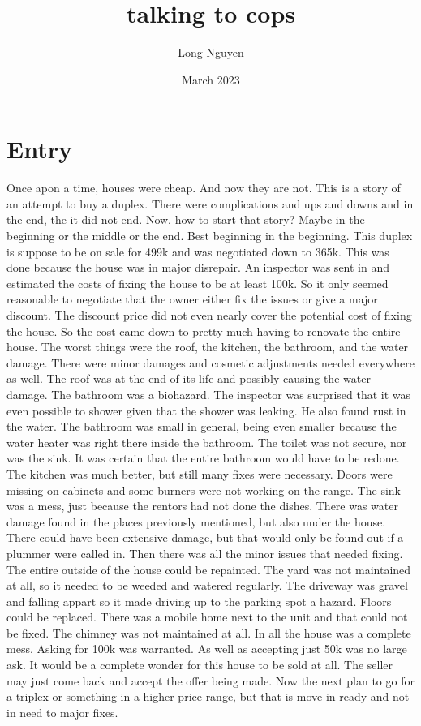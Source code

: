 \documentclass{article}
\title{talking to cops}
\author{Long Nguyen}
\date{March 2023}
\begin{document}
\maketitle

\section{Entry}
Once apon a time, houses were cheap. And now they are not. This is a story of an attempt to buy a duplex. There were complications and ups and downs and in the end, the it did not end. Now, how to start that story? Maybe in the beginning or the middle or the end. Best beginning in the beginning.
This duplex is suppose to be on sale for 499k and was negotiated down to 365k. This was done because the house was in major disrepair. An inspector was sent in and estimated the costs of fixing the house to be at least 100k. So it only seemed reasonable to negotiate that the owner either fix the issues or give a major discount. The discount price did not even nearly cover the potential cost of fixing the house.
So the cost came down to pretty much having to renovate the entire house. The worst things were the roof, the kitchen, the bathroom, and the water damage. There were minor damages and cosmetic adjustments needed everywhere as well.
The roof was at the end of its life and possibly causing the water damage. The bathroom was a biohazard. The inspector was surprised that it was even possible to shower given that the shower was leaking. He also found rust in the water. The bathroom was small in general, being even smaller because the water heater was right there inside the bathroom. The toilet was not secure, nor was the sink. It was certain that the entire bathroom would have to be redone. The kitchen was much better, but still many fixes were necessary. Doors were missing on cabinets and some burners were not working on the range. The sink was a mess, just because the rentors had not done the dishes. There was water damage found in the places previously mentioned, but also under the house. There could have been extensive damage, but that would only be found out if a plummer were called in.
Then there was all the minor issues that needed fixing. The entire outside of the house could be repainted. The yard was not maintained at all, so it needed to be weeded and watered regularly. The driveway was gravel and falling appart so it made driving up to the parking spot a hazard. Floors could be replaced. There was a mobile home next to the unit and that could not be fixed. The chimney was not maintained at all.
In all the house was a complete mess. Asking for 100k was warranted. As well as accepting just 50k was no large ask. It would be a complete wonder for this house to be sold at all. The seller may just come back and accept the offer being made. Now the next plan to go for a triplex or something in a higher price range, but that is move in ready and not in need to major fixes.
\end{document}
